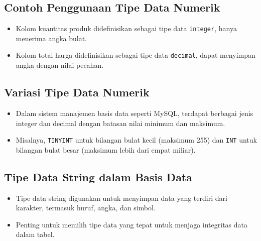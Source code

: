 \documentclass{article}
\begin{document}
\subsection{Contoh Penggunaan Tipe Data Numerik}
\begin{itemize}
    \item Kolom kuantitas produk didefinisikan sebagai tipe data \texttt{integer}, hanya menerima angka bulat.
    \item Kolom total harga didefinisikan sebagai tipe data \texttt{decimal}, dapat menyimpan angka dengan nilai pecahan.
\end{itemize}

\subsection{Variasi Tipe Data Numerik}
\begin{itemize}
    \item Dalam sistem manajemen basis data seperti MySQL, terdapat berbagai jenis integer dan decimal dengan batasan nilai minimum dan maksimum.
    \item Misalnya, \texttt{TINYINT} untuk bilangan bulat kecil (maksimum 255) dan \texttt{INT} untuk bilangan bulat besar (maksimum lebih dari empat miliar).
\end{itemize}

\subsection{Tipe Data String dalam Basis Data}
\begin{itemize}
    \item Tipe data string digunakan untuk menyimpan data yang terdiri dari karakter, termasuk huruf, angka, dan simbol.
    \item Penting untuk memilih tipe data yang tepat untuk menjaga integritas data dalam tabel.
\end{itemize}
\end{document}
